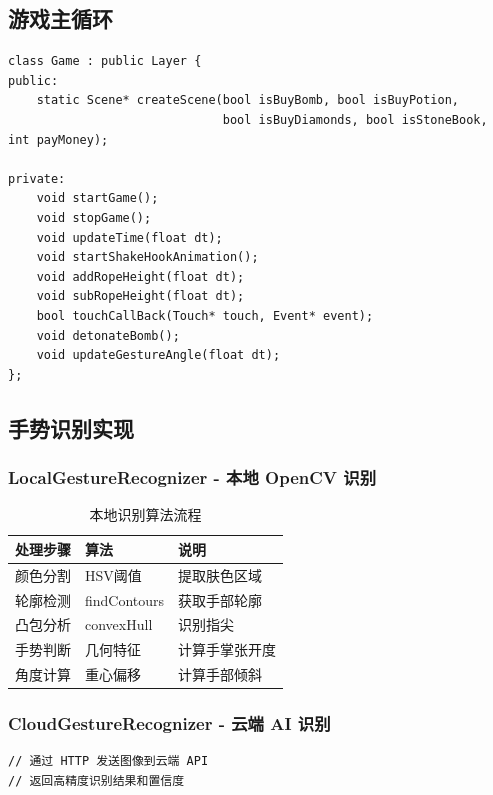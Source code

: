 \documentclass{article}
\begin{document}
\subsection{游戏主循环}

\begin{lstlisting}[caption=Game 类核心设计]
class Game : public Layer {
public:
    static Scene* createScene(bool isBuyBomb, bool isBuyPotion, 
                              bool isBuyDiamonds, bool isStoneBook, int payMoney);
    
private:
    void startGame();
    void stopGame();
    void updateTime(float dt);
    void startShakeHookAnimation();
    void addRopeHeight(float dt);
    void subRopeHeight(float dt);
    bool touchCallBack(Touch* touch, Event* event);
    void detonateBomb();
    void updateGestureAngle(float dt);
};
\end{lstlisting}

\subsection{手势识别实现}

\subsubsection{LocalGestureRecognizer - 本地 OpenCV 识别}

\begin{table}[H]
\centering
\begin{tabular}{|l|l|l|}
\hline
\textbf{处理步骤} & \textbf{算法} & \textbf{说明} \\
\hline
颜色分割 & HSV阈值 & 提取肤色区域 \\
\hline
轮廓检测 & findContours & 获取手部轮廓 \\
\hline
凸包分析 & convexHull & 识别指尖 \\
\hline
手势判断 & 几何特征 & 计算手掌张开度 \\
\hline
角度计算 & 重心偏移 & 计算手部倾斜 \\
\hline
\end{tabular}
\caption{本地识别算法流程}
\end{table}

\subsubsection{CloudGestureRecognizer - 云端 AI 识别}

\begin{lstlisting}[caption=云端识别示意]
// 通过 HTTP 发送图像到云端 API
// 返回高精度识别结果和置信度
\end{lstlisting}
\end{document}
